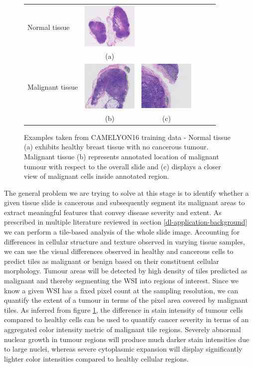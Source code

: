 \documentclass{l4proj}
\begin{document}
\begin{figure}[H]
\centering
\begin{tabular}{lccccc}
Normal tissue&
\includegraphics[width=100px]{images/camelyon16-normal-example.png}&
\\&
(a)\\
Malignant tissue&
 \includegraphics[width=100px]{images/Camelyon16-cancer-example1.png}&
 \includegraphics[width=100px]{images/Camelyon16-cancer-example2.png}&
 \\&
 (b)&(c)\\
\end{tabular}
\caption{Examples taken from CAMELYON16 training data - Normal tissue (a) exhibits healthy breast tissue with no cancerous tumour. Malignant tissue (b) represents annotated location of malignant tumour with respect to the overall slide and (c) displays a closer view of malignant cells inside annotated region.}
\label{fig:camelyon16-example}
\end{figure}

The general problem we are trying to solve at this stage is to identify whether a given tissue slide is cancerous and subsequently segment its malignant areas to extract meaningful features that convey disease severity and extent. As prescribed in multiple literature reviewed in section \ref{dl-application-background} we can perform a tile-based analysis of the whole slide image. Accounting for differences in cellular structure and texture observed in varying tissue samples, we can use the visual differences observed in healthy and cancerous cells to predict tiles as malignant or benign based on their constituent cellular morphology. Tumour areas will be detected by high density of tiles predicted as malignant and thereby segmenting the WSI into regions of interest. Since we know a given WSI has a fixed pixel count at the sampling resolution, we can quantify the extent of a tumour in terms of the pixel area covered by malignant tiles. As inferred from figure \ref{fig:camelyon16-example}, the difference in stain intensity of tumour cells compared to healthy cells can be used to quantify cancer severity in terms of an aggregated color intensity metric of malignant tile regions. Severely abnormal nuclear growth in tumour regions will produce much darker stain intensities due to large nuclei, whereas severe cytoplasmic expansion will display significantly lighter color intensities compared to healthy cellular regions.
\end{document}
